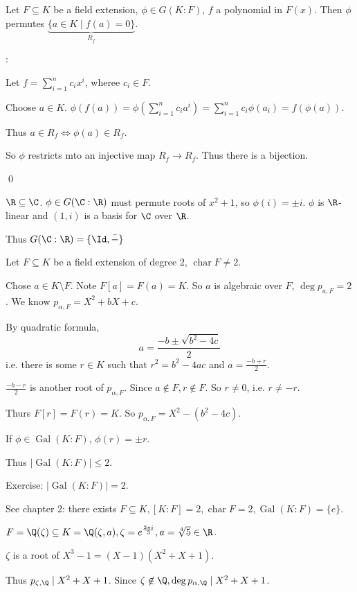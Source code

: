\documentclass[x11names,reqno,14pt]{extarticle}
\DeclareMathOperator{\Gal}{Gal}
\DeclareMathOperator{\Char}{char}
\begin{document}
\prop

Let $F \subseteq K$ be a field extension, $\phi\in G(K:F)$, $f$ a polynomial in $F(x)$. Then $\phi$ permutes $\underbrace{\{a\in K \mid f(a) = 0\}}_{R_f}$. 

\proof:

Let $f = \sum_{i=1}^nc_ix^i$, wheree $c_i \in F$. 

Choose $a \in K$. $\phi(f(a)) = \phi(\sum_{i=1}^nc_ia^i) = \sum_{i=1}^nc_i\phi(a_i) = f(\phi(a))$. 

Thus $a \in R_f \iff \phi(a) \in R_f$. 

So $\phi$ restricts mto an injective map $R_f \to R_f$. Thus there is a bijection.

\qed

\exm

$\R\subseteq\C$. $\phi\in G(\C:\R)$ must permute roots of $x^2 + 1$, so $\phi(i) = \pm i$. $\phi$ is $\R$-linear and $(1, i)$ is a basis for $\C$ over $\R$. 

Thus $G(\C:\R) = \{\Id, \bar{-}\}$

\exm

Let $F \subseteq K$ be a field extension of degree 2, $\operatorname{char} F \neq 2$. 

Chose $a \in K \setminus F$. 
Note $F[a] = F(a) = K$. So $a$ is algebraic over $F$, $\deg p_{a, F} = 2$. We know $p_{\alpha, F} = X^2 + bX + c$. 

By quadratic formula, 
\[
a = \frac{-b\pm\sqrt{b^2-4c}}{2}
\]
i.e. there is some $r\in K$ such that $r^2 = b^2 - 4ac$ and $a = \frac{-b + r}{2}$.

$\frac{-b-r}{2}$ is another root of $p_{\alpha,F}$. Since $a\not\in F, r\not\in F$. So $r\neq 0$, i.e. $r\neq -r$. 

Thurs $F[r] = F(r) = K$. So $p_{\alpha,F} = X^2 - (b^2 - 4c)$. 

If $\phi \in \Gal(K:F)$, $\phi(r) = \pm r$. 

Thus $|\Gal(K:F)| \leq 2$. 

Exercise: $|\Gal(K:F)| = 2$. 

\exm See chapter 2: there exists $F \subseteq K, [K:F] = 2, \Char F = 2, \Gal(K:F) = \{e\}$. 

\exm

$F = \Q(\zeta) \subseteq K = \Q(\zeta, a), \zeta = e^{\frac{2\pi i}{3}}, a = \sqrt[4]{5}\in \R$. 

$\zeta$ is a root of $X^3 -1 = (X - 1)(X^2 + X + 1)$. 

Thus $p_{\zeta,\Q}\mid X^2 + X +1$. Since $\zeta\not\in\Q,\deg p_{\alpha, \Q}\mid X^2 + X + 1$. 
\end{document}
